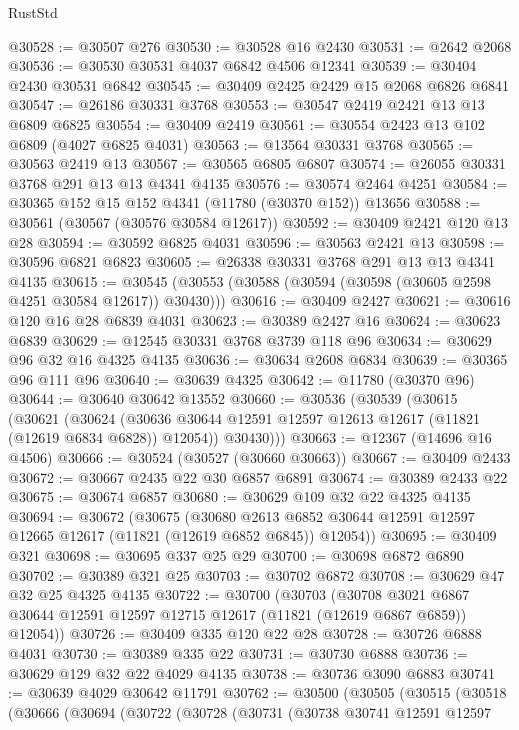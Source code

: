 \begin{lexlean}{RustStd}
\begin{coremodule}
@30528 := @30507 @276
@30530 := @30528 @16 @2430
@30531 := @2642 @2068
@30536 := @30530 @30531 @4037 @6842 @4506 @12341
@30539 := @30404 @2430 @30531 @6842
@30545 := @30409 @2425 @2429 @15 @2068 @6826 @6841
@30547 := @26186 @30331 @3768
@30553 := @30547 @2419 @2421 @13 @13 @6809 @6825
@30554 := @30409 @2419
@30561 := @30554 @2423 @13 @102 @6809 (@4027 @6825 @4031)
@30563 := @13564 @30331 @3768
@30565 := @30563 @2419 @13
@30567 := @30565 @6805 @6807
@30574 := @26055 @30331 @3768 @291 @13 @13 @4341 @4135
@30576 := @30574 @2464 @4251
@30584 := @30365 @152 @15 @152 @4341 (@11780 (@30370 @152)) @13656
@30588 := @30561 (@30567 (@30576 @30584 @12617))
@30592 := @30409 @2421 @120 @13 @28
@30594 := @30592 @6825 @4031
@30596 := @30563 @2421 @13
@30598 := @30596 @6821 @6823
@30605 := @26338 @30331 @3768 @291 @13 @13 @4341 @4135
@30615 := @30545 (@30553 (@30588 (@30594 (@30598 (@30605 @2598 @4251 @30584 @12617)) @30430)))
@30616 := @30409 @2427
@30621 := @30616 @120 @16 @28 @6839 @4031
@30623 := @30389 @2427 @16
@30624 := @30623 @6839
@30629 := @12545 @30331 @3768 @3739 @118 @96
@30634 := @30629 @96 @32 @16 @4325 @4135
@30636 := @30634 @2608 @6834
@30639 := @30365 @96 @111 @96
@30640 := @30639 @4325
@30642 := @11780 (@30370 @96)
@30644 := @30640 @30642 @13552
@30660 := @30536
    (@30539
      (@30615
        (@30621
          (@30624 (@30636 @30644 @12591 @12597 @12613 @12617 (@11821 (@12619 @6834 @6828)) @12054))
          @30430)))
@30663 := @12367 (@14696 @16 @4506)
@30666 := @30524 (@30527 (@30660 @30663))
@30667 := @30409 @2433
@30672 := @30667 @2435 @22 @30 @6857 @6891
@30674 := @30389 @2433 @22
@30675 := @30674 @6857
@30680 := @30629 @109 @32 @22 @4325 @4135
@30694 := @30672
    (@30675
      (@30680 @2613 @6852 @30644 @12591 @12597 @12665 @12617 (@11821 (@12619 @6852 @6845)) @12054))
@30695 := @30409 @321
@30698 := @30695 @337 @25 @29
@30700 := @30698 @6872 @6890
@30702 := @30389 @321 @25
@30703 := @30702 @6872
@30708 := @30629 @47 @32 @25 @4325 @4135
@30722 := @30700
    (@30703
      (@30708 @3021 @6867 @30644 @12591 @12597 @12715 @12617 (@11821 (@12619 @6867 @6859)) @12054))
@30726 := @30409 @335 @120 @22 @28
@30728 := @30726 @6888 @4031
@30730 := @30389 @335 @22
@30731 := @30730 @6888
@30736 := @30629 @129 @32 @22 @4029 @4135
@30738 := @30736 @3090 @6883
@30741 := @30639 @4029 @30642 @11791
@30762 := @30500
    (@30505
      (@30515
        (@30518
          (@30666
            (@30694
              (@30722
                (@30728
                  (@30731
                    (@30738
                      @30741
                      @12591
                      @12597

\end{coremodule}
\end{lexlean}
